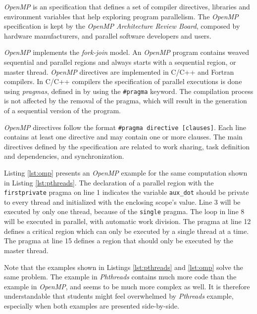 \textit{OpenMP} is an specification that defines a set of compiler directives,
libraries and environment variables that help exploring program parallelism.
The \textit{OpenMP} specification is kept by the \textit{OpenMP Architecture
Review Board}, composed by hardware manufacturers, and parallel software
developers and users.

\textit{OpenMP} implements the \textit{fork-join} model. An \textit{OpenMP}
program contains weaved sequential and parallel regions and always starts with
a sequential region, or master thread.  \textit{OpenMP} directives are
implemented in C/C++ and Fortran compilers. In C/C++ compilers the
specification of parallel executions is done using \textit{pragmas}, defined in
by using the \texttt{\#pragma} keyword.
The compilation process is not affected by the removal of the pragma,
which will result in the generation of a sequential version of the program.

\textit{OpenMP} directives follow the format \texttt{\#pragma directive
[clauses]}.  Each line contains at least one directive and may contain one or
more clauses. The main directives defined by the specification are related
to work sharing, task definition and dependencies, and synchronization.

Listing \ref{lst:omp} presents an \textit{OpenMP} example for the
same computation shown in Listing \ref{lst:pthreads}. The
declaration of a parallel region with the \texttt{firstprivate} pragma on line
1 indicates the variable \texttt{aux\_dot} should be private to every thread
and initialized with the enclosing scope's value.  Line 3 will be executed by
only one thread, because of the \texttt{single} pragma.
The loop in line 8 will be executed in parallel, with automatic work
division.  The pragma at line 12 defines a critical region which can only be
executed by a single thread at a time. The pragma at line 15 defines a
region that should only be executed by the master thread.

Note that the examples shown in Listings \ref{lst:pthreads} and
\ref{lst:omp} solve the same problem. The example in \textit{Phthreads}
contains much more code than the example in \textit{OpenMP}, and seems
to be much more complex as well. It is therefore understandable that students might
feel overwhelmed by \textit{Pthreads} example, especially when both examples are
presented side-by-side.

